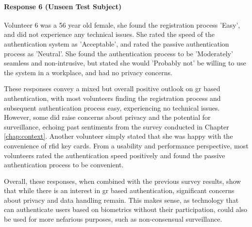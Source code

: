 \paragraph{Response 6 (Unseen Test Subject)} Volunteer 6 was a 56 year old female, she found the registration process 'Easy', and did not experience any technical issues.
She rated the speed of the authentication system as 'Acceptable', and rated the passive authentication process as 'Neutral'.
She found the authentication process to be 'Moderately' seamless and non-intrusive, but stated she would 'Probably not' be willing to use the system in a workplace, and had no privacy concerns.

These responses convey a mixed but overall positive outlook on \ac{gr} based authentication, with most volunteers finding the registration process and subsequent authentication process easy, experiencing no technical issues.
However, some did raise concerns about privacy and the potential for surveillance, echoing past sentiments from the survey conducted in Chapter \ref{chap:context}.
Another volunteer simply stated that she was happy with the convenience of \ac{rfid} key cards.
From a usability and performance perspective, most volunteers rated the authentication speed positively and found the passive authentication process to be convenient.

Overall, these responses, when combined with the previous survey results, show that while there is an interest in \ac{gr} based authentication, significant concerns about privacy and data handling remain.
This makes sense, as technology that can authenticate users based on biometrics without their participation, could also be used for more nefarious purposes, such as non-consensual surveillance.

